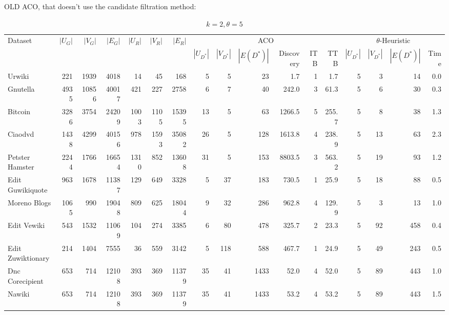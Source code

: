 \documentclass{article}
\begin{document}
OLD ACO, that doesn't use the candidate filtration method:
\begin{landscape}
    \begin{table}[htbp]
      \centering
      \caption{$k=2, \theta=5$}
    
      \centering
      \setlength{\tabcolsep}{3.5pt} %
      \begin{tabular}{l *{16}{r}} %
        \toprule
        Dataset & $|U_G|$ & $|V_G|$ & $|E_G|$ & $|U_R|$ & $|V_R|$ & $|E_R|$ & \multicolumn{6}{c}{ACO} & \multicolumn{4}{c}{$\theta$-Heuristic} \\
        \cmidrule(lr){8-13} \cmidrule(lr){14-17}
        & & & & & & & $|U_{D^*}|$ & $|V_{D^*}|$ & $|E(D^*)|$ & Discovery & ITB & TTB & $|U_{D^*}|$ & $|V_{D^*}|$ & $|E(D^*)|$ & Time \\
        \midrule
        Urwiki & 221 & 1939 & 4018 & 14 & 45 & 168 & 5 & 5 & 23 & 1.7 & 1 & 1.7 & 5 & 3 & 14 & 0.0 \\
        Gnutella & 4935 & 10856 & 40017 & 421 & 227 & 2758 & 6 & 7 & 40 & 242.0 & 3 & 61.3 & 5 & 6 & 30 & 0.3 \\
        Bitcoin & 3286 & 3754 & 24209 & 1003 & 1105 & 15395 & 13 & 5 & 63 & 1266.5 & 5 & 255.7 & 5 & 8 & 38 & 1.3 \\
        Ciaodvd & 1438 & 4299 & 40156 & 978 & 1593 & 35082 & 26 & 5 & 128 & 1613.8 & 4 & 238.9 & 5 & 13 & 63 & 2.3 \\
        Petster Hamster & 2244 & 1766 & 16654 & 1310 & 852 & 13608 & 31 & 5 & 153 & 8803.5 & 3 & 563.2 & 5 & 19 & 93 & 1.2 \\
        Edit Guwikiquote & 963 & 1678 & 11387 & 129 & 649 & 3328 & 5 & 37 & 183 & 730.5 & 1 & 25.9 & 5 & 18 & 88 & 0.5 \\
        Moreno Blogs & 1065 & 990 & 19048 & 809 & 625 & 18044 & 9 & 32 & 286 & 962.8 & 4 & 129.9 & 5 & 3 & 13 & 1.0 \\
        Edit Vewiki & 543 & 1532 & 11069 & 104 & 274 & 3385 & 6 & 80 & 478 & 325.7 & 2 & 23.3 & 5 & 92 & 458 & 0.4 \\
        Edit Zuwiktionary & 214 & 1404 & 7555 & 36 & 559 & 3142 & 5 & 118 & 588 & 467.7 & 1 & 24.9 & 5 & 49 & 243 & 0.5 \\
        Dnc Corecipient & 653 & 714 & 12108 & 393 & 369 & 11379 & 35 & 41 & 1433 & 52.0 & 4 & 52.0 & 5 & 89 & 443 & 1.0 \\
        Nawiki & 653 & 714 & 12108 & 393 & 369 & 11379 & 35 & 41 & 1433 & 53.2 & 4 & 53.2 & 5 & 89 & 443 & 1.5 \\

\end{tabular}
\end{table}
\end{landscape}
\end{document}
